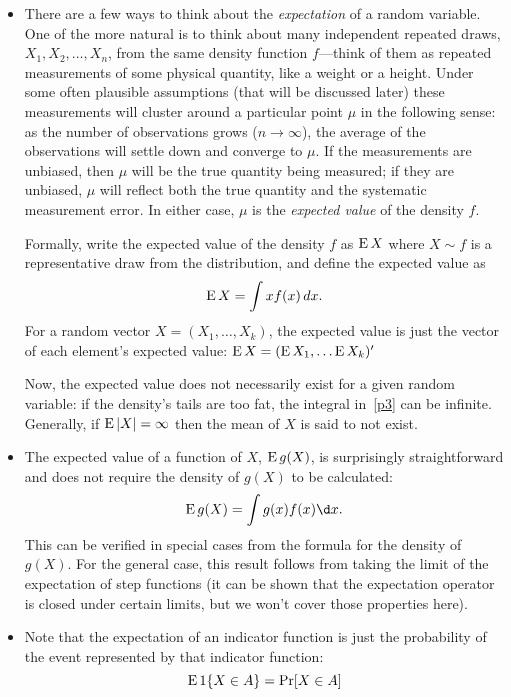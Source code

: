 \begin{itemize}[leftmargin=0pt]
\item There are a few ways to think about the \emph{expectation} of a
  random variable.  One of the more natural is to think about many
  independent repeated draws, $X_1, X_2,\dots,X_n$, from the same density
  function $f$---think of them as repeated measurements of some physical
  quantity, like a weight or a height.  Under some often plausible
  assumptions (that will be discussed later) these measurements
  will cluster around a particular point $\mu$ in the following sense:
  as the number of observations grows ($n \to \infty$), the average of the
  observations will settle down and converge to $\mu$.  If the
  measurements are unbiased, then $\mu$ will be the true quantity being
  measured; if they are unbiased, $\mu$ will reflect both the true
  quantity and the systematic measurement error.  In either case, $\mu$
  is the \emph{expected value} of the density $f$.

  Formally, write the expected value of the density $f$ as $\operatorname{E} X$
  where $X \sim f$ is a representative draw from the distribution, and
  define the expected value as
  \begin{equation}\label{p3}
    \E X = \int x f(x) \dx.
  \end{equation}
  For a random vector $X = (X_1,\dots,X_k)$, the expected value is just the
  vector of each element's expected value:
  $\operatorname{E} X = (\operatorname{E} X_1,\dots \operatorname{E} X_k)'$

  Now, the expected value does not necessarily exist for a given
  random variable: if the density's tails are too fat, the integral
  in~\eqref{p3} can be infinite.  Generally, if $\operatorname{E} |X| = \infty$ then
  the mean of $X$ is said to not exist.

\item The expected value of a function of $X$, $\operatorname{E} g(X)$, is
  surprisingly straightforward and does not require the density of
  $g(X)$ to be calculated:
  \begin{equation*}
    \E g(X) = \int g(x) f(x) \d x.
  \end{equation*}
  This can be verified in special cases from the formula for the
  density of $g(X)$.  For the general case, this result follows from
  taking the limit of the expectation of step functions (it can be
  shown that the expectation operator is closed under certain limits,
  but we won't cover those properties here).

\item Note that the expectation of an indicator function is just the
  probability of the event represented by that indicator function:
  \begin{equation*}
    \operatorname{E} \operatorname{1}\{ X \in A \} = \operatorname{Pr}[X \in A]
  \end{equation*}


\end{itemize}
